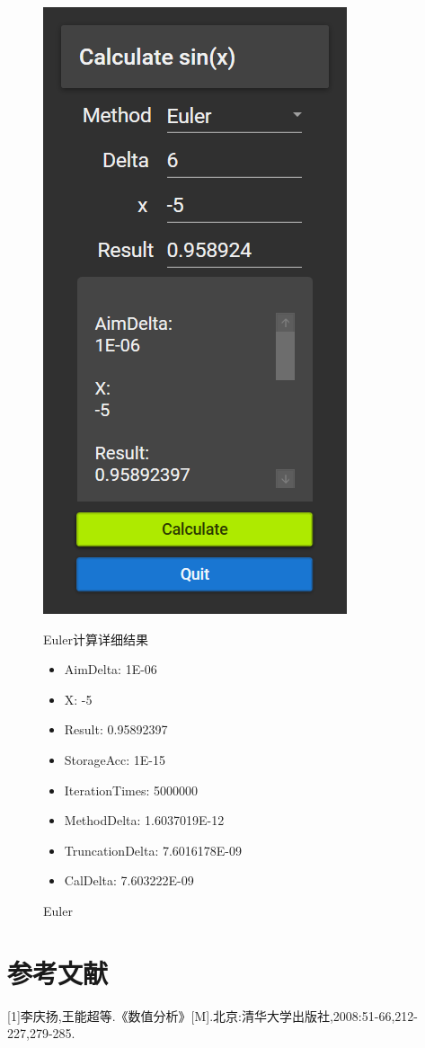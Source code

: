\documentclass[lang=cn,11pt,a4paper]{elegantpaper}
\begin{document}
\begin{figure}[htbp]
  \begin{minipage}[htbp]{0.4\linewidth}
    \centering
    \includegraphics[width=0.8\linewidth]{src/F.png}
    \caption{Euler}
    \centering
  \end{minipage}
  \hfill
  \begin{minipage}[htbp]{0.5\linewidth}
    Euler计算详细结果
    \begin{itemize}
      \item AimDelta: 1E-06
      \item X: -5
      \item Result: 0.95892397
      \item StorageAcc: 1E-15
      \item IterationTimes: 5000000
      \item MethodDelta: 1.6037019E-12
      \item TruncationDelta: 7.6016178E-09
      \item CalDelta: 7.603222E-09
    \end{itemize}
  \end{minipage}
\end{figure}

\section{参考文献}
[1]李庆扬,王能超等.《数值分析》[M].北京:清华大学出版社,2008:51-66,212-227,279-285.
\end{document}
